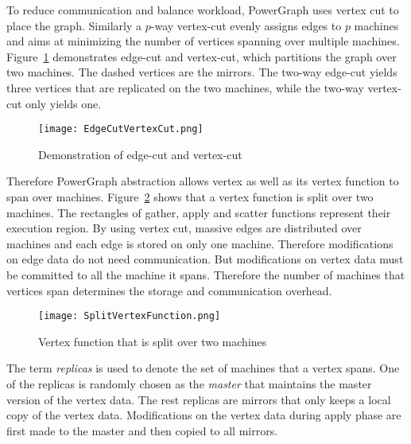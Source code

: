 To reduce communication and balance workload, PowerGraph uses vertex cut to place the graph. Similarly a $p$-way vertex-cut evenly assigns edges to $p$ machines and aims at minimizing the number of vertices spanning over multiple machines. Figure~\ref{fig:EdgeCutVertexCut} demonstrates edge-cut and vertex-cut, which partitions the graph over two machines. The dashed vertices are the mirrors. The two-way edge-cut yields three vertices that are replicated on the two machines, while the two-way vertex-cut only yields one.

\begin{figure}
  \begin{center}
    \texttt{[image: EdgeCutVertexCut.png]}
    \caption{Demonstration of edge-cut and vertex-cut}
    \label{fig:EdgeCutVertexCut}
  \end{center}
\end{figure}

Therefore PowerGraph abstraction allows vertex as well as its vertex function to span over machines. Figure~\ref{fig:SplitVertexFunction} shows that a vertex function is split over two machines. The rectangles of gather, apply and scatter functions represent their execution region. By using vertex cut, massive edges are distributed over machines and each edge is stored on only one machine. Therefore modifications on edge data do not need communication. But modifications on vertex data must be committed to all the machine it spans. Therefore the number of machines that vertices span determines the storage and communication overhead.

\begin{figure}
  \begin{center}
    \texttt{[image: SplitVertexFunction.png]}
    \caption{Vertex function that is split over two machines}
    \label{fig:SplitVertexFunction}
  \end{center}
\end{figure}


The term \textit{replicas} is used to denote the set of machines that a vertex spans. One of the replicas is randomly chosen as the \textit{master} that maintains the master version of the vertex data. The rest replicas are mirrors that only keeps a local copy of the vertex data. Modifications on the vertex data during apply phase are first made to the master and then copied to all mirrors.

